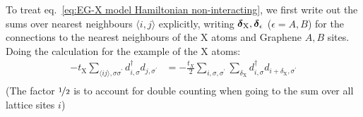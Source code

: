 To treat eq.~\ref{eq:EG-X model Hamiltonian non-interacting}, we first write out the sums over nearest neighbours \(\langle i, j \rangle\) explicitly, writing \(\bm{\mathrm{\delta}}_{\mathrm{X}}, \bm{\mathrm{\delta}}_{\epsilon}\) (\(\epsilon = A, B\)) for the connections to the nearest neighbours of the \(\mathrm{X}\) atoms and Graphene \(A, B\) sites.
Doing the calculation for the example of the \(\mathrm{X}\) atoms:
\begin{align}
    -t_{\mathrm{X}} \sum_{\langle ij \rangle, \sigma \sigma^{\prime}} d_{i, \sigma}^{\dagger} d_{j, \sigma^{\prime}}
    &= -\frac{t_X}{2} \sum_{i,\sigma, \sigma^{\prime}} \sum_{\delta_{\mathrm{X}}} d_{i, \sigma}^{\dagger} d_{i + \delta_{\mathrm{X}}, \sigma^{\prime}} \label{eq:EG-X model X atoms nearest neighbours written out} \\
\end{align}
(The factor \(\nicefrac{1}{2}\) is to account for double counting when going to the sum over all lattice sites \(i\))


